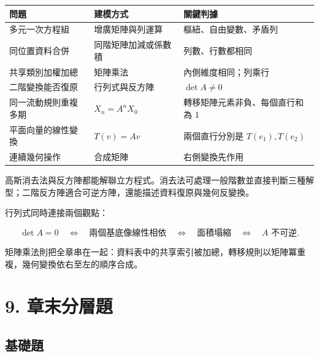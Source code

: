 \documentclass[11pt,a4paper]{article}
\newcounter{none}
\begin{document}
{\def\LTcaptype{none} %
\begin{longtable}[]{@{}
  >{\raggedright\arraybackslash}p{}
  >{\raggedright\arraybackslash}p{}
  >{\raggedright\arraybackslash}p{}@{}}
\toprule\noalign{}
\begin{minipage}[b]{\linewidth}\raggedright
問題
\end{minipage} & \begin{minipage}[b]{\linewidth}\raggedright
建模方式
\end{minipage} & \begin{minipage}[b]{\linewidth}\raggedright
關鍵判據
\end{minipage} \\
\midrule\noalign{}
\endhead
\bottomrule\noalign{}
\endlastfoot
多元一次方程組 & 增廣矩陣與列運算 & 樞紐、自由變數、矛盾列 \\
同位置資料合併 & 同階矩陣加減或係數積 & 列數、行數都相同 \\
共享類別加權加總 & 矩陣乘法 & 內側維度相同；列乘行 \\
二階變換能否復原 & 行列式與反方陣 & \(\det A\ne0\) \\
同一流動規則重複多期 & \(X_n=A^nX_0\) & 轉移矩陣元素非負、每個直行和為 \(1\) \\
平面向量的線性變換 & \(T(v)=Av\) & 兩個直行分別是 \(T(e_1),T(e_2)\) \\
連續幾何操作 & 合成矩陣 & 右側變換先作用 \\
\end{longtable}
}

高斯消去法與反方陣都能解聯立方程式。消去法可處理一般階數並直接判斷三種解型；二階反方陣適合可逆方陣，還能描述資料復原與幾何反變換。

行列式同時連接兩個觀點：

\[
\det A=0
\quad\Longleftrightarrow\quad
\text{兩個基底像線性相依}
\quad\Longleftrightarrow\quad
\text{面積塌縮}
\quad\Longleftrightarrow\quad
A\text{ 不可逆}.
\]

矩陣乘法則把全章串在一起：資料表中的共享索引被加總，轉移規則以矩陣冪重複，幾何變換依右至左的順序合成。

\section{9. 章末分層題}\label{ux7ae0ux672bux5206ux5c64ux984c}

\subsection{基礎題}\label{ux57faux790eux984c}
\end{document}
